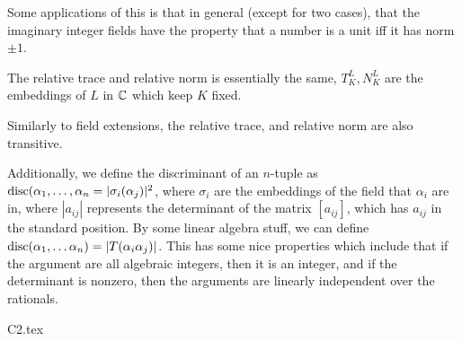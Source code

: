\documentclass{article}
\begin{document}
Some applications of this is that in general (except for two cases), that the imaginary integer fields have the property that a number is a unit iff it has norm \(\pm1\).

\begin{definition}
The relative trace and relative norm is essentially the same, \(T^L_K, N^L_K\) are the embeddings of \(L\) in \(\mathbb C\) which keep \(K\) fixed.
\end{definition}
Similarly to field extensions, the relative trace, and relative norm are also transitive.

Additionally, we define the discriminant of an \(n\)-tuple as \(\operatorname{disc}(\alpha_1, \dots, \alpha_n = |\sigma_i(\alpha_j)|^2\), where \(\sigma_i\) are the embeddings of the field that \(\alpha_i\) are in, where \(|a_{ij}|\) represents the determinant of the matrix \([a_{ij}]\), which has \(a_{ij}\) in the standard position. By some linear algebra stuff, we can define \(\operatorname{disc}(\alpha_1, \dots \alpha_n)=|T(\alpha_i\alpha_j)|\). 
This has some nice properties which include that if the argument are all algebraic integers, then it is an integer, and if the determinant is nonzero, then the arguments are linearly independent over the rationals.

{C2.tex}
\end{document}
